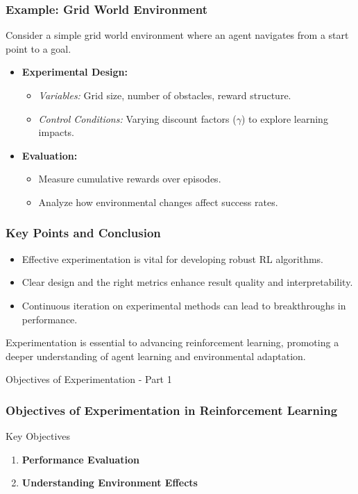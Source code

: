 \documentclass[aspectratio=169]{beamer}
\begin{document}
\begin{frame}[fragile]
    \frametitle{Example: Grid World Environment}
    Consider a simple grid world environment where an agent navigates from a start point to a goal.
    \begin{itemize}
        \item \textbf{Experimental Design:}
        \begin{itemize}
            \item \textit{Variables:} Grid size, number of obstacles, reward structure.
            \item \textit{Control Conditions:} Varying discount factors (\(\gamma\)) to explore learning impacts.
        \end{itemize}

        \item \textbf{Evaluation:}
        \begin{itemize}
            \item Measure cumulative rewards over episodes.
            \item Analyze how environmental changes affect success rates.
        \end{itemize}
    \end{itemize}
\end{frame}

\begin{frame}[fragile]
    \frametitle{Key Points and Conclusion}
    \begin{itemize}
        \item Effective experimentation is vital for developing robust RL algorithms.
        \item Clear design and the right metrics enhance result quality and interpretability.
        \item Continuous iteration on experimental methods can lead to breakthroughs in performance.
    \end{itemize}
    Experimentation is essential to advancing reinforcement learning, promoting a deeper understanding of agent learning and environmental adaptation.
\end{frame}

\begin{frame}[fragile]{Objectives of Experimentation - Part 1}
    \frametitle{Objectives of Experimentation in Reinforcement Learning}

    \begin{block}{Key Objectives}
        \begin{enumerate}
            \item \textbf{Performance Evaluation}
            \item \textbf{Understanding Environment Effects}
        \end{enumerate}
    \end{block}

\end{frame}
\end{document}
